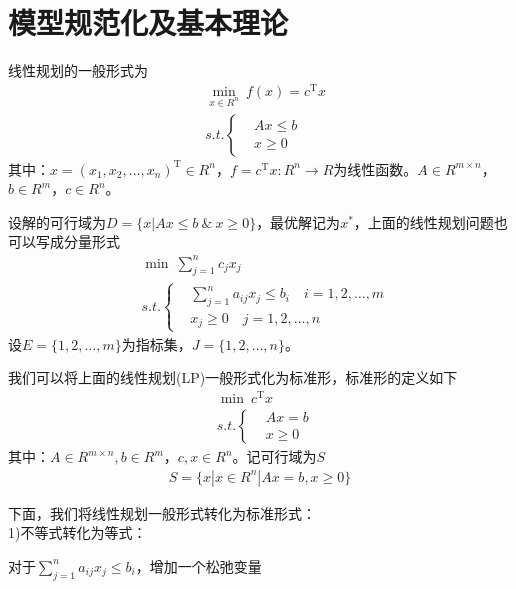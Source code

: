 \section{模型规范化及基本理论}
    \par
    线性规划的一般形式为
    \begin{align*}
    & \mathop{\min}\limits_{x\in R^n}\ f(x)=c^\mathrm{T} x\\
    &s.t.\left\{
    \begin{aligned}
    &Ax \leqslant b\\
    &x \geqslant 0
    \end{aligned}
    \right.
    \end{align*}
    其中：$x=(x_1,x_2,\ldots,x_n)^\mathrm{T}\in R^n $，$f=c^\mathrm{T} x:R^n \to R$为线性函数。$A \in R^{m\times n}$，$b \in R^m$，$c \in R^n$。
    \par
    设解的可行域为$D=\{x|Ax \leqslant b\ \& \ x \geqslant 0\}$，最优解记为$x^*$，上面的线性规划问题也可以写成分量形式
    \begin{align*}
    & \min \  \mathop{\sum}\limits_{j=1}^nc_jx_j\\
    &s.t.\left\{
    \begin{aligned}
    &\mathop{\sum}\limits_{j=1}^na_{ij}x_j\leqslant b_i \quad i=1,2,\ldots,m\\
    &x_j \geqslant 0\quad j=1,2,\ldots,n
    \end{aligned}
    \right.
    \end{align*}
    设$E=\{1,2,\ldots,m\}$为指标集，$J=\{1,2,\dots,n\}$。
    \par
    我们可以将上面的线性规划(LP)一般形式化为标准形，标准形的定义如下
    \begin{align*}
    & \mathop{\min}\  c^\mathrm{T} x\\
    &s.t.\left\{
    \begin{aligned}
    &Ax = b\\
    &x \geqslant 0
    \end{aligned}
    \right.
    \end{align*}
    其中：$A \in R^{m\times n},b\in R^m$，$c,x \in R^n$。记可行域为$S$
    \begin{align*}
    S=\{x|x\in R^n|Ax=b,x \geqslant 0\}
    \end{align*}
    \par
    下面，我们将线性规划一般形式转化为标准形式：\\
    1)不等式转化为等式：\par
    对于$\mathop {\sum}\limits_{j=1}^n a_{ij}x_j \leqslant b_i$，增加一个松弛变量
